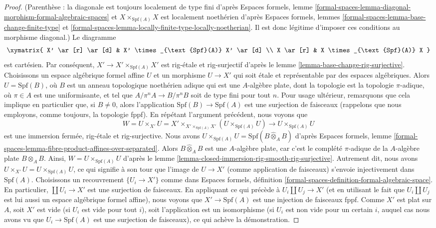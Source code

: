 \begin{proof}
(Parenthèse : la diagonale est toujours localement de type fini d'après
Espaces formels, lemme
\ref{formal-spaces-lemma-diagonal-morphism-formal-algebraic-spaces}
et $X \times_{\text{Spf}(A)} X$ est localement noethérien d'après
Espaces formels, lemmes
\ref{formal-spaces-lemma-base-change-finite-type} et
\ref{formal-spaces-lemma-locally-finite-type-locally-noetherian}.
Il est donc légitime d'imposer ces conditions au morphisme diagonal.)
Le diagramme
$$
\xymatrix{
X' \ar[r] \ar[d] & X' \times_{\text{Spf}(A)} X' \ar[d] \\
X \ar[r] & X \times_{\text{Spf}(A)} X
}
$$
est cartésien. Par conséquent, $X' \to X' \times_{\text{Spf}(A)} X'$
est rig-étale et rig-surjectif d'après le
lemme \ref{lemma-base-change-rig-surjective}.
Choisissons un espace algébrique formel affine $U$ et un morphisme
$U \to X'$ qui soit étale et représentable par des espaces algébriques.
Alors $U = \text{Spf}(B)$, où $B$ est un anneau topologique noethérien adique
qui est une $A$-algèbre plate, dont la topologie est la topologie
$\pi$-adique, où $\pi \in A$ est une uniformisante, et tel que
$A/\pi^n A \to B/\pi^n B$ soit de type fini pour tout $n$.
Pour usage ultérieur, remarquons que cela implique en particulier que, si
$B \not = 0$, alors l'application $\text{Spf}(B) \to \text{Spf}(A)$ est une
surjection de faisceaux (rappelons que nous employons, comme toujours,
la topologie fppf). En répétant l'argument précédent, nous voyons que
$$
W = U \times_{X'} U =
X' \times_{X' \times_{\text{Spf}(A)} X'} (U \times_{\text{Spf}(A)} U)
\longrightarrow
U \times_{\text{Spf}(A)} U
$$
est une immersion fermée, rig-étale et rig-surjective. Nous avons
$U \times_{\text{Spf}(A)} U = \text{Spf}(B \widehat{\otimes}_A B)$
d'après Espaces formels, lemme
\ref{formal-spaces-lemma-fibre-product-affines-over-separated}.
Alors $B \widehat{\otimes}_A B$ est une $A$-algèbre plate,
car c'est le complété $\pi$-adique de la $A$-algèbre plate $B \otimes_A B$.
Ainsi, $W = U \times_{\text{Spf}(A)} U$ d'après le
lemme \ref{lemma-closed-immersion-rig-smooth-rig-surjective}.
Autrement dit, nous avons $U \times_{X'} U = U \times_{\text{Spf}(A)} U$,
ce qui signifie à son tour que l'image de $U \to X'$ (comme application
de faisceaux) s'envoie injectivement dans $\text{Spf}(A)$.
Choisissons un recouvrement $\{U_i \to X'\}$ comme dans Espaces formels, définition
\ref{formal-spaces-definition-formal-algebraic-space}.
En particulier, $\coprod U_i \to X'$ est une surjection de faisceaux.
En appliquant ce qui précède à $U_i \coprod U_j \to X'$ (et en utilisant
le fait que $U_i \amalg U_j$ est lui aussi un espace algébrique formel
affine), nous voyons que $X' \to \text{Spf}(A)$ est une injection
de faisceaux fppf. Comme $X'$ est plat sur $A$, soit $X'$ est vide
(si $U_i$ est vide pour tout $i$), soit l'application est un isomorphisme
(si $U_i$ est non vide pour un certain $i$, auquel cas nous avons vu que
$U_i \to \text{Spf}(A)$ est une surjection de faisceaux),
ce qui achève la démonstration.
\end{proof}

